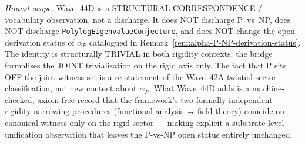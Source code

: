 \begin{remark}
\emph{Honest scope.} Wave~44D is a STRUCTURAL CORRESPONDENCE / vocabulary observation, not a discharge. It does NOT discharge P~vs~NP, does NOT discharge \texttt{PolylogEigenvalueConjecture}, and does NOT change the open-derivation status of $\alpha_P$ catalogued in Remark~\ref{rem:alpha-P-NP-derivation-status}. The identity is structurally TRIVIAL in both rigidity contexts; the bridge formalises the JOINT trivialisation on the rigid axis only. The fact that P sits OFF the joint witness set is a re-statement of the Wave~42A twisted-sector classification, not new content about $\alpha_P$. What Wave~44D adds is a machine-checked, axiom-free record that the framework's two formally independent rigidity-narrowing procedures (functional analysis ↔ field theory) coincide on canonical witness only on the rigid sector --- making explicit a substrate-level unification observation that leaves the P-vs-NP open status entirely unchanged.
\end{remark}

